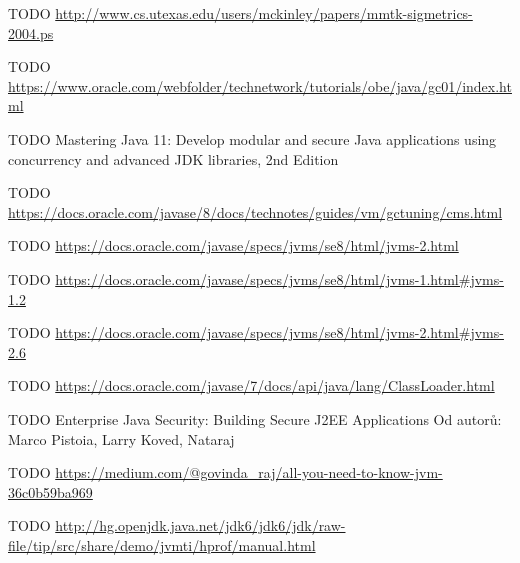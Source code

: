 \begin{literatura}{99}
    TODO \url{http://www.cs.utexas.edu/users/mckinley/papers/mmtk-sigmetrics-2004.ps}

    TODO \url{https://www.oracle.com/webfolder/technetwork/tutorials/obe/java/gc01/index.html}

    TODO Mastering Java 11: Develop modular and secure Java applications using concurrency and advanced JDK libraries, 2nd Edition

    TODO \url{https://docs.oracle.com/javase/8/docs/technotes/guides/vm/gctuning/cms.html}

    TODO \url{https://docs.oracle.com/javase/specs/jvms/se8/html/jvms-2.html}

    TODO \url{https://docs.oracle.com/javase/specs/jvms/se8/html/jvms-1.html#jvms-1.2}

    TODO \url{https://docs.oracle.com/javase/specs/jvms/se8/html/jvms-2.html#jvms-2.6}

    TODO \url{https://docs.oracle.com/javase/7/docs/api/java/lang/ClassLoader.html}

    TODO Enterprise Java Security: Building Secure J2EE Applications
    Od autorů: Marco Pistoia, Larry Koved, Nataraj 

    TODO \url{https://medium.com/@govinda_raj/all-you-need-to-know-jvm-36c0b59ba969}

    TODO \url{http://hg.openjdk.java.net/jdk6/jdk6/jdk/raw-file/tip/src/share/demo/jvmti/hprof/manual.html}

\end{literatura}